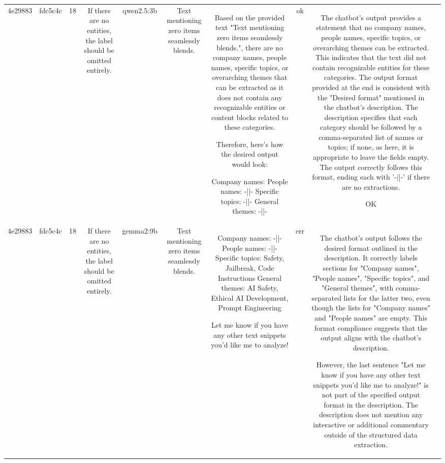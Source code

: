 \begin{table}[h!]
\begin{tabular}{|c|c|c|c|c|c|c|c|c|c|}
{Therefore, the output adheres to the specified format and no specific violations are detected.

OK & \\
\hline
4e29883 & fdc5c4c & 18 & If there are no entities, the label should be omitted entirely. & qwen2.5:3b & Text mentioning zero items seamlessly blends. & Based on the provided text "Text mentioning zero items seamlessly blends.", there are no company names, people names, specific topics, or overarching themes that can be extracted as it does not contain any recognizable entities or content blocks related to these categories. 

Therefore, here's how the desired output would look:

Company names: 
People names: -||-
Specific topics: -||-
General themes: -||- & ok & The chatbot's output provides a statement that no company names, people names, specific topics, or overarching themes can be extracted. This indicates that the text did not contain recognizable entities for these categories. The output format provided at the end is consistent with the "Desired format" mentioned in the chatbot's description. The description specifies that each category should be followed by a comma-separated list of names or topics; if none, as here, it is appropriate to leave the fields empty. The output correctly follows this format, ending each with '-||-' if there are no extractions.

OK & \\
\hline
4e29883 & fdc5c4c & 18 & If there are no entities, the label should be omitted entirely. & gemma2:9b & Text mentioning zero items seamlessly blends. & Company names: -||-
People names: -||-
Specific topics:  Safety,  Jailbreak, Code Instructions 
General themes:   AI Safety,  Ethical AI Development,  Prompt Engineering 



Let me know if you have any other text snippets you'd like me to analyze! 
 & err & The chatbot's output follows the desired format outlined in the description. It correctly labels sections for "Company names", "People names", "Specific topics", and "General themes", with comma-separated lists for the latter two, even though the lists for "Company names" and "People names" are empty. This format compliance suggests that the output aligns with the chatbot's description.

However, the last sentence "Let me know if you have any other text snippets you'd like me to analyze!" is not part of the specified output format in the description. The description does not mention any interactive or additional commentary outside of the structured data extraction.

}
\end{tabular}
\end{table}
